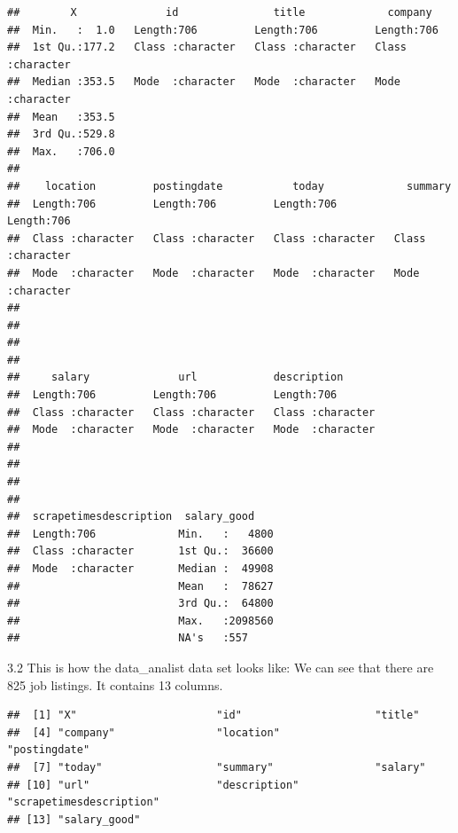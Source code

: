 \documentclass[
]{article}
\begin{document}
\begin{verbatim}
##        X              id               title             company         
##  Min.   :  1.0   Length:706         Length:706         Length:706        
##  1st Qu.:177.2   Class :character   Class :character   Class :character  
##  Median :353.5   Mode  :character   Mode  :character   Mode  :character  
##  Mean   :353.5                                                           
##  3rd Qu.:529.8                                                           
##  Max.   :706.0                                                           
##                                                                          
##    location         postingdate           today             summary         
##  Length:706         Length:706         Length:706         Length:706        
##  Class :character   Class :character   Class :character   Class :character  
##  Mode  :character   Mode  :character   Mode  :character   Mode  :character  
##                                                                             
##                                                                             
##                                                                             
##                                                                             
##     salary              url            description       
##  Length:706         Length:706         Length:706        
##  Class :character   Class :character   Class :character  
##  Mode  :character   Mode  :character   Mode  :character  
##                                                          
##                                                          
##                                                          
##                                                          
##  scrapetimesdescription  salary_good     
##  Length:706             Min.   :   4800  
##  Class :character       1st Qu.:  36600  
##  Mode  :character       Median :  49908  
##                         Mean   :  78627  
##                         3rd Qu.:  64800  
##                         Max.   :2098560  
##                         NA's   :557
\end{verbatim}

3.2 This is how the data\_analist data set looks like: We can see that
there are 825 job listings. It contains 13 columns.

\begin{verbatim}
##  [1] "X"                      "id"                     "title"                 
##  [4] "company"                "location"               "postingdate"           
##  [7] "today"                  "summary"                "salary"                
## [10] "url"                    "description"            "scrapetimesdescription"
## [13] "salary_good"
\end{verbatim}
\end{document}
